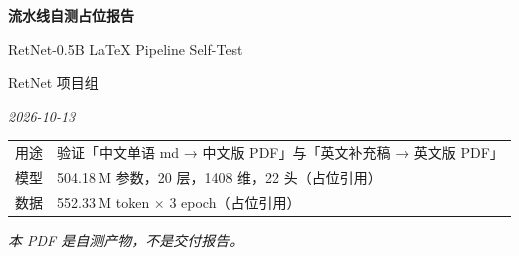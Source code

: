 \thispagestyle{empty}

\begin{center}
\vspace*{3.2cm}

{\LARGE\bfseries 流水线自测占位报告}

\vspace{0.55cm}

{\large RetNet-0.5B LaTeX Pipeline Self-Test}

\vspace{1.1cm}

{\normalsize RetNet 项目组}

\vspace{0.25cm}

{\small\itshape 2026-10-13}

\vspace{2.2cm}

\begin{minipage}{0.80\textwidth}
\centering\small
\begin{tabular}{@{}rl@{}}
\toprule
用途 & 验证「中文单语 md → 中文版 PDF」与「英文补充稿 → 英文版 PDF」\\
模型 & 504.18\,M 参数，20 层，1408 维，22 头（占位引用）\\
数据 & 552.33\,M token $\times$ 3 epoch（占位引用）\\
\bottomrule
\end{tabular}
\end{minipage}

\vfill

{\small\itshape 本 PDF 是自测产物，不是交付报告。}

\vspace{1.2cm}
\end{center}

\clearpage
